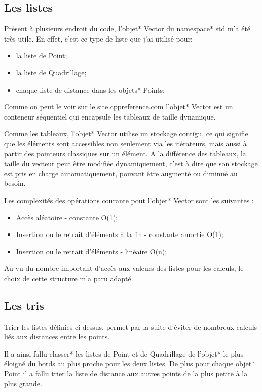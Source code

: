 \documentclass[stage2a]{tnreport}
\begin{document}
\subsection{Les listes}

Présent à plusieurs endroit du code, l'\gls{objet}* Vector du \gls{namespace}* std m'a été très utile. En effet, c'est ce type de liste que j'ai utilisé pour:
\begin{itemize}
\item la liste de Point;
\item la liste de Quadrillage;
\item chaque liste de distance dans les \gls{objet}s* Points;\\
\end{itemize}

Comme on peut le voir sur le site cppreference.com\cite{vector} l'\gls{objet}* Vector est un conteneur séquentiel qui encapsule les tableaux de taille dynamique.

Comme les tableaux, l'\gls{objet}* Vector utilise un stockage contigu, ce qui signifie que les éléments sont accessibles non seulement via les itérateurs, mais aussi à partir des pointeurs classiques sur un élément. A la différence des tableaux, la taille du vecteur peut être modifiée dynamiquement, c'est à dire que son stockage est pris en charge automatiquement, pouvant être augmenté ou diminué au besoin.

Les complexités des opérations courante pout l'\gls{objet}* Vector sont les suivantes :
\begin{itemize}
\item Accès aléatoire - constante O(1);
\item Insertion ou le retrait d'éléments à la fin - constante amortie O(1);
\item Insertion ou le retrait d'éléments - linéaire O(n);\\
\end{itemize}

Au vu du nombre important d'accès aux valeurs des listes pour les calculs, le choix de cette structure m'a paru adapté.

\subsection{Les tris}

Trier les listes définies ci-dessus, permet par la suite d'éviter de nombreux calculs liés aux distances entre les points.

Il a ainsi fallu \gls{classe}r* les listes de Point et de Quadrillage de l'\gls{objet}* le plus éloigné du bords au plus proche pour les deux listes. De plus pour chaque \gls{objet}* Point il a fallu trier la liste de distance aux autres points de la plus petite à la plus grande.
\end{document}
